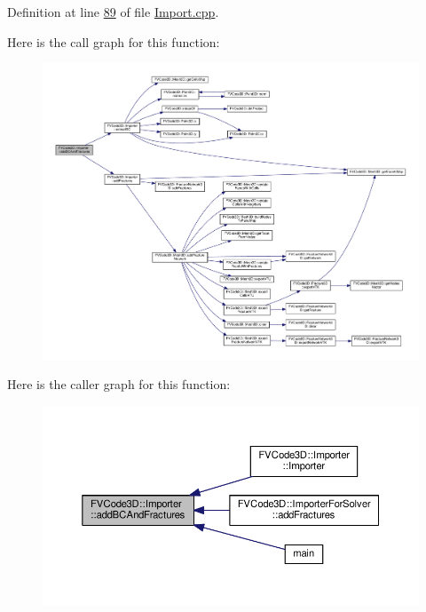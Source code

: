 Definition at line \hyperlink{Import_8cpp_source_l00089}{89} of file \hyperlink{Import_8cpp_source}{Import.\+cpp}.



Here is the call graph for this function\+:
\nopagebreak
\begin{figure}[H]
\begin{center}
\leavevmode
\includegraphics[width=350pt]{classFVCode3D_1_1Importer_ac21d82671c21b2e4069511ef0585d7f6_cgraph}
\end{center}
\end{figure}




Here is the caller graph for this function\+:
\nopagebreak
\begin{figure}[H]
\begin{center}
\leavevmode
\includegraphics[width=350pt]{classFVCode3D_1_1Importer_ac21d82671c21b2e4069511ef0585d7f6_icgraph}
\end{center}
\end{figure}


